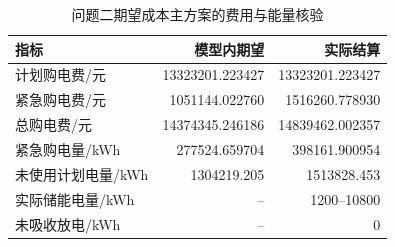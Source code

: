 \begin{table}[H]
\centering\small
\caption{问题二期望成本主方案的费用与能量核验}\label{tab:q2-results}
\setlength{\tabcolsep}{4pt}
\begin{tabular}{lrr}
\toprule
指标 & 模型内期望 & 实际结算 \\
\midrule
计划购电费/元 & 13323201.223427 & 13323201.223427 \\
紧急购电费/元 & 1051144.022760 & 1516260.778930 \\
总购电费/元 & 14374345.246186 & 14839462.002357 \\
紧急购电量/kWh & 277524.659704 & 398161.900954 \\
未使用计划电量/kWh & 1304219.205 & 1513828.453 \\
实际储能电量/kWh & -- & 1200--10800 \\
未吸收放电/kWh & -- & 0 \\
\bottomrule
\end{tabular}
\end{table}
